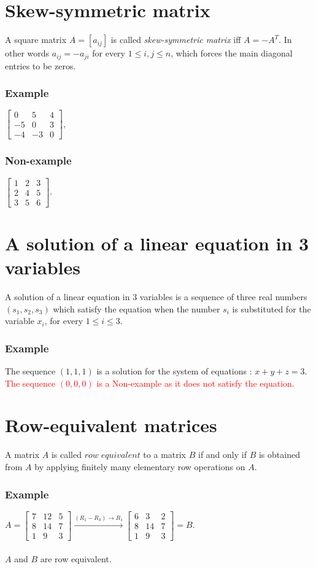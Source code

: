 \documentclass[a4paper,12pt]{article}
\begin{document}
\section{Skew-symmetric matrix}
A square matrix $A=[a_{ij}]$ is called \textit{skew-symmetric matrix} iff $A=-A^{T}$. In other words $a_{ij}=-a_{ji}$ for every $1 \leq i,j \leq n$, which forces the main diagonal entries to be zeros.
\begin{multicols}{2}
\subsubsection*{Example}
$\begin{bmatrix}
  0 & 5 & 4 \\
  -5 & 0 & 3 \\
  -4 & -3 & 0
\end{bmatrix},$
\subsubsection*{Non-example}
$\begin{bmatrix}
  1 & 2 & 3 \\
  2 & 4 & 5 \\
  3 & 5 & 6
\end{bmatrix}.$
\end{multicols}
\section{A solution of a linear equation in 3 variables 
}
A solution of a linear equation in 3 variables is a sequence of three real numbers $(s_1,s_2,s_3)$ which satisfy the equation when the number $s_i$ is substituted for the variable $x_i$, for every $1 \leq i \leq 3$.
  \subsubsection*{Example}
The sequence $(1, 1, 1)$ is a solution for the system of equations : $x+y+z=3.$\\
\textcolor{red}{The sequence $(0,0,0)$ is a Non-example as it does not satisfy the equation.}
\section{Row-equivalent matrices}
A matrix $A$ is called $row \; equivalent$ to a matrix $B$ if and only if $B$ is obtained from $A$ by applying finitely many elementary row operations on $A$.
\subsubsection*{Example}
$
  A= \begin{bmatrix}
    7 & 12 & 5 \\
    8 & 14 & 7 \\
    1 & 9 & 3
  \end{bmatrix} \xrightarrow{{(R_1-R_3)}\to{R_1}} \begin{bmatrix}
    6 & 3 & 2 \\
    8 & 14 & 7 \\
    1 & 9 & 3
  \end{bmatrix} = B.
$
\\ \\ $A$ and $B$ are row equivalent.
\end{document}
